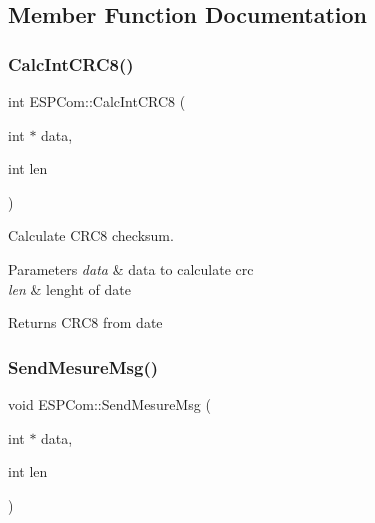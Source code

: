 \subsection{Member Function Documentation}
\mbox{\label{class_e_s_p_com_a7fe56834c6cd56973666812d758bcfb9}} 
\subsubsection{\texorpdfstring{Calc\+Int\+C\+R\+C8()}{CalcIntCRC8()}}
{\footnotesize\ttfamily int E\+S\+P\+Com\+::\+Calc\+Int\+C\+R\+C8 (\begin{DoxyParamCaption}\item[{int $\ast$}]{data,  }\item[{int}]{len }\end{DoxyParamCaption})\hspace{0.3cm}{\ttfamily [private]}}



Calculate C\+R\+C8 checksum. 


\begin{DoxyParams}{Parameters}
{\em data} & data to calculate crc \\
\hline
{\em len} & lenght of date \\
\hline
\end{DoxyParams}
\begin{DoxyReturn}{Returns}
C\+R\+C8 from date 
\end{DoxyReturn}
\mbox{\label{class_e_s_p_com_a11cf05fd9d9c7ebe9b49b18e0d2fa0ab}} 
\subsubsection{\texorpdfstring{Send\+Mesure\+Msg()}{SendMesureMsg()}}
{\footnotesize\ttfamily void E\+S\+P\+Com\+::\+Send\+Mesure\+Msg (\begin{DoxyParamCaption}\item[{int $\ast$}]{data,  }\item[{int}]{len }\end{DoxyParamCaption})}



